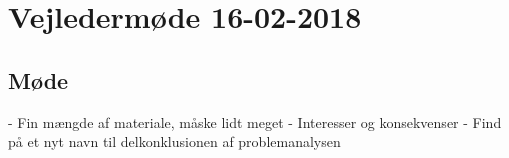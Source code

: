 \newpage
\section{Vejledermøde 16-02-2018}
\subsection{Møde}
- Fin mængde af materiale, måske lidt meget
- Interesser og konsekvenser
- Find på et nyt navn til delkonklusionen af problemanalysen